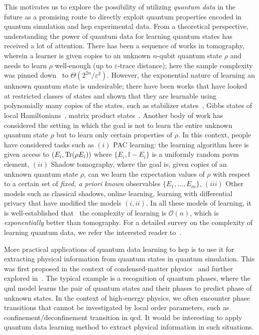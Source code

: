 This motivates us to explore the possibility of utilizing {\it quantum data} in the future as a promising route to directly exploit quantum properties encoded in quantum simulation and \gls{hep} experimental data.
From a theoretical perspective, understanding the power of quantum data for learning quantum states has received a lot of attention. There has been a sequence of works in tomography, wherein a learner is given copies to an unknown $n$-qubit quantum state $\rho$ and needs to learn $\rho$ well-enough (up to $\varepsilon$-trace distance); here the sample complexity was pinned down~\cite{haah2017sample,o2016efficient} to $\Theta(2^{2n}/\varepsilon^2)$. 
However, the exponential nature of learning an unknown quantum state is undesirable; there have been works that have looked at restricted classes of states and shown that they are learnable using polynomially many copies of the states, such as stabilizer states~\cite{montanaro2017learning}, Gibbs states of local Hamiltonians~\cite{anshu2021sample}, matrix product states~\cite{CPFSGBLPL10}. Another body of work has considered the setting in which the goal is not to learn the entire unknown quantum state $\rho$ but to learn only certain properties of $\rho$. In this context, people have considered tasks such as $(i)$ PAC learning: the learning algorithm here is given access to $(E_i,\Tr(\rho E_i))$ where  $\{E_i,\mathbb{I}-E_i\}$ is a uniformly random \gls{povm} element, $(ii)$ Shadow tomography, where the goal is, given copies of an unknown quantum state $\rho$, can we learn the expectation values of $\rho$ with respect to a certain set of \emph{fixed, a priori known} observables $\{E_1,\ldots,E_m\}$, $(iii)$ Other models such as classical shadows, online learning, learning with differential privacy that have modified the models $(i,ii)$. In all these models of learning, it is well-established  that~\cite{aaronson:shadow,aaronson2018online,aaronson2007learnability} the complexity of learning is $\mathcal{O}(n)$, which is \emph{exponentially} better than tomography.  For a detailed survey on the complexity of learning quantum data, we refer the interested reader to~\cite{anshusurvey}.

More practical applications of quantum data learning to \gls{hep} is to use it for extracting physical information from quantum states in quantum simulation.
This was first proposed in the context of condensed-matter physics~\cite{2019NatPh..15.1273C}
and further explored in~\cite{2021arXiv210612627H,2021PRXQ....2d0321B,PhysRevA.102.012415,2021arXiv210903400S,bernien2017probing, 2021arXiv210306712B,monaco2023quantum}.
The typical example is a recognition of quantum phases, where the \gls{qml} model learns the pair of quantum states and their phases to predict phase of unknown states.
In the context of high-energy physics, we often encounter phase transitions that cannot be investigated by local order parameters, such as confinement/deconfinement transition in \gls{qcd}.
It would be interesting to apply quantum data learning method to extract physical information in such situations.


